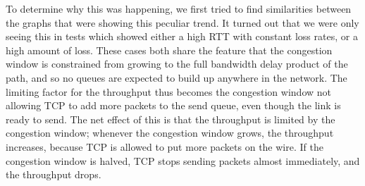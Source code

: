 To determine why this was happening, we first tried to find similarities
between the graphs that were showing this peculiar trend. It turned out that we
were only seeing this in tests which showed either a high RTT with constant loss
rates, or a high amount of loss. These cases both share the feature that the
congestion window is constrained from growing to the full bandwidth delay
product of the path, and so no queues are expected to build up anywhere in the
network. The limiting factor for the throughput thus becomes the congestion window not
allowing TCP to add more packets to the send queue, even though the link is
ready to send. The net effect of this is that the throughput is limited by the
congestion window; whenever the congestion window grows, the throughput
increases, because TCP is allowed to put more packets on the wire. If the
congestion window is halved, TCP stops sending packets almost immediately, and
the throughput drops.
